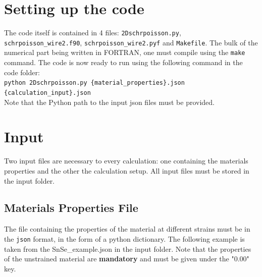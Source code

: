 \documentclass[a4paper,12pt]{article}
\begin{document}
\section{Setting up the code}
The code itself is contained in 4 files: \texttt{2Dschrpoisson.py}, \texttt{schrpoisson\_wire2.f90}, \texttt{schrpoisson\_wire2.pyf} and \texttt{Makefile}. The bulk of the numerical part being written in FORTRAN, one must compile using the \texttt{make} command. The code is now ready to run using the following command in the code folder:\\

\texttt{python 2Dschrpoisson.py \{material\_properties\}.json  \{calculation\_input\}.json}\\

\noindent Note that the Python path to the input json files must be provided.

\section{Input}
Two input files are necessary to every calculation: one containing the materials properties and the other the calculation setup. All input files must be stored in the input folder.
\subsection{Materials Properties File}
The file containing the properties of the material at different strains must be in the \texttt{json} format, in the form of a python dictionary. The following example is taken from the SnSe\_example.json in the input folder. Note that the properties of the unstrained material are \textbf{mandatory} and must be given under the "0.00" key.\\
\end{document}
